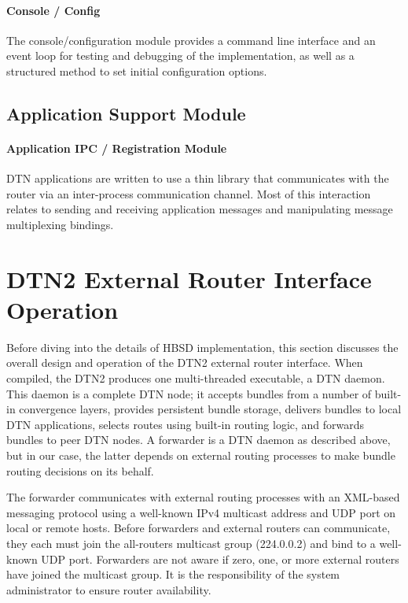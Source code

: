 \paragraph{Console / Config}
The console/configuration module provides a command line interface and an event loop for testing and debugging of the implementation, as well as a structured method to set initial configuration options. 

\subsection{Application Support Module}

\paragraph{Application IPC / Registration Module}

DTN applications are written to use a thin library that communicates with the router via an inter-process communication channel. Most of this interaction relates to sending and receiving application messages and manipulating message multiplexing bindings.

\section{DTN2 External Router Interface Operation}

Before diving into the details of HBSD implementation, this section discusses the overall design and operation of the DTN2 external router interface. When compiled, the DTN2 produces one multi-threaded executable, a DTN daemon. This daemon is a complete DTN node; it accepts bundles from a number of built-in convergence layers, provides persistent bundle storage, delivers bundles to local DTN applications, selects routes using built-in routing logic, and forwards bundles to peer DTN nodes. A forwarder is a DTN daemon as described above, but in our case, the latter depends on external routing processes to make bundle routing decisions on its behalf.

The forwarder communicates with external routing processes with an XML-based messaging protocol using a well-known IPv4 multicast address and UDP port on local or remote hosts. Before forwarders and external routers can communicate, they each must join the all-routers multicast group (224.0.0.2) and bind to a well-known UDP port. Forwarders are not aware if zero, one, or more external routers have joined the multicast group. It is the responsibility of the system administrator to ensure router availability.

